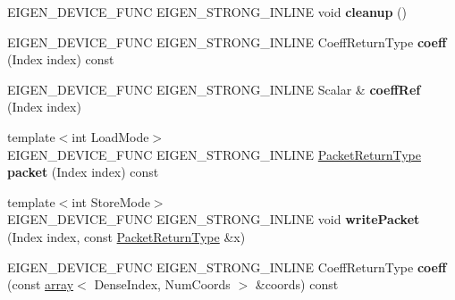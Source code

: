 \begin{DoxyCompactItemize}
E\+I\+G\+E\+N\+\_\+\+D\+E\+V\+I\+C\+E\+\_\+\+F\+U\+NC E\+I\+G\+E\+N\+\_\+\+S\+T\+R\+O\+N\+G\+\_\+\+I\+N\+L\+I\+NE void {\bfseries cleanup} ()
\item 
\mbox{\label{struct_eigen_1_1_tensor_evaluator_a7747e4223120fe698801fa12c186561d}} 
E\+I\+G\+E\+N\+\_\+\+D\+E\+V\+I\+C\+E\+\_\+\+F\+U\+NC E\+I\+G\+E\+N\+\_\+\+S\+T\+R\+O\+N\+G\+\_\+\+I\+N\+L\+I\+NE Coeff\+Return\+Type {\bfseries coeff} (Index index) const
\item 
\mbox{\label{struct_eigen_1_1_tensor_evaluator_ac3af69e412d8b4f1e65fcca48e08db26}} 
E\+I\+G\+E\+N\+\_\+\+D\+E\+V\+I\+C\+E\+\_\+\+F\+U\+NC E\+I\+G\+E\+N\+\_\+\+S\+T\+R\+O\+N\+G\+\_\+\+I\+N\+L\+I\+NE Scalar \& {\bfseries coeff\+Ref} (Index index)
\item 
\mbox{\label{struct_eigen_1_1_tensor_evaluator_af8ba36b08b6aaabc799d5d86a48dcb9d}} 
{\footnotesize template$<$int Load\+Mode$>$ }\\E\+I\+G\+E\+N\+\_\+\+D\+E\+V\+I\+C\+E\+\_\+\+F\+U\+NC E\+I\+G\+E\+N\+\_\+\+S\+T\+R\+O\+N\+G\+\_\+\+I\+N\+L\+I\+NE \hyperlink{group___sparse_core___module}{Packet\+Return\+Type} {\bfseries packet} (Index index) const
\item 
\mbox{\label{struct_eigen_1_1_tensor_evaluator_ab67599edd4fad044494d6043ddc876df}} 
{\footnotesize template$<$int Store\+Mode$>$ }\\E\+I\+G\+E\+N\+\_\+\+D\+E\+V\+I\+C\+E\+\_\+\+F\+U\+NC E\+I\+G\+E\+N\+\_\+\+S\+T\+R\+O\+N\+G\+\_\+\+I\+N\+L\+I\+NE void {\bfseries write\+Packet} (Index index, const \hyperlink{group___sparse_core___module}{Packet\+Return\+Type} \&x)
\item 
\mbox{\label{struct_eigen_1_1_tensor_evaluator_aefd30945bf0ff3afa451a750bcd10158}} 
E\+I\+G\+E\+N\+\_\+\+D\+E\+V\+I\+C\+E\+\_\+\+F\+U\+NC E\+I\+G\+E\+N\+\_\+\+S\+T\+R\+O\+N\+G\+\_\+\+I\+N\+L\+I\+NE Coeff\+Return\+Type {\bfseries coeff} (const \hyperlink{class_eigen_1_1array}{array}$<$ Dense\+Index, Num\+Coords $>$ \&coords) const
\item 
\mbox{\label{struct_eigen_1_1_tensor_evaluator_a78e691c3a908d98afe75f3d9b1101669}} 

\end{DoxyCompactItemize}
